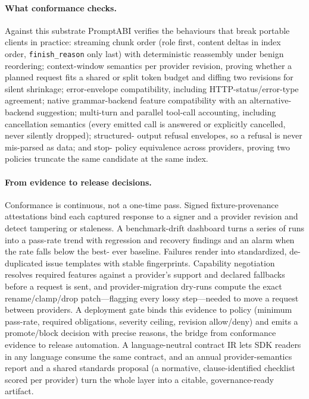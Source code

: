 \documentclass[10pt]{article}
\begin{document}
\paragraph{What conformance checks.} Against this substrate PromptABI verifies the
behaviours that break portable clients in practice: streaming chunk order
(role first, content deltas in index order, \texttt{finish\_reason} only last)
with deterministic reassembly under benign reordering; context-window semantics
per provider revision, proving whether a planned request fits a shared or split
token budget and diffing two revisions for silent shrinkage; error-envelope
compatibility, including HTTP-status/error-type agreement; native grammar-backend
feature compatibility with an alternative-backend suggestion; multi-turn and
parallel tool-call accounting, including cancellation semantics (every emitted
call is answered or explicitly cancelled, never silently dropped); structured-
output refusal envelopes, so a refusal is never mis-parsed as data; and stop-
policy equivalence across providers, proving two policies truncate the same
candidate at the same index.

\paragraph{From evidence to release decisions.} Conformance is continuous, not a
one-time pass. Signed fixture-provenance attestations bind each captured response
to a signer and a provider revision and detect tampering or staleness. A
benchmark-drift dashboard turns a series of runs into a pass-rate trend with
regression and recovery findings and an alarm when the rate falls below the best-
ever baseline. Failures render into standardized, de-duplicated issue templates
with stable fingerprints. Capability negotiation resolves required features
against a provider's support and declared fallbacks before a request is sent, and
provider-migration dry-runs compute the exact rename/clamp/drop patch---flagging
every lossy step---needed to move a request between providers. A deployment gate
binds this evidence to policy (minimum pass-rate, required obligations, severity
ceiling, revision allow/deny) and emits a promote/block decision with precise
reasons, the bridge from conformance evidence to release automation. A
language-neutral contract IR lets SDK readers in any language consume the same
contract, and an annual provider-semantics report and a shared standards proposal
(a normative, clause-identified checklist scored per provider) turn the whole
layer into a citable, governance-ready artifact.
\end{document}

